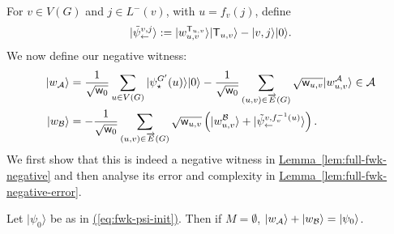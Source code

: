 \documentclass{theoretics}
\newcommand{\eq}[1]{\hyperref[eq:#1]{(\ref*{eq:#1})}}
\newcommand{\lem}[1]{\hyperref[lem:#1]{Lemma~\ref*{lem:#1}}}
\def\ket#1{{\lvert}#1\rangle}
\renewcommand{\>}{\rangle}
\newcommand{\<}{\langle}
\renewcommand{\(}{\left(}
\renewcommand{\)}{\right)}
\def\w{{\sf w}}
\begin{document}
For $v\in V(G)$ and $j\in L^-(v)$, with $u=f_v(j)$, define
\begin{equation}
\ket{\tilde\psi_{\leftarrow}^{v,j}}:=\ket{w_{u,v}^{{\sf T}_{u,v}}}\ket{{\sf T}_{u,v}}-\ket{v,j}\ket{0}.\label{eq:tilde-psi}
\end{equation}
We now define our negative witness:
\begin{align*}
\ket{w_{\cal A}} &= \frac{1}{\sqrt{\w_0}}\sum_{u\in V(G)}\ket{\psi_{\star}^{G'}(u)}\ket{0}-\frac{1}{\sqrt{\w_0}}\sum_{(u,v)\in\overrightarrow{E}(G)}\sqrt{\w_{u,v}}\ket{w_{u,v}^{\cal A}}    \in{\cal A}\\
\ket{w_{\cal B}} &= -\frac{1}{\sqrt{\w_0}}\sum_{(u,v)\in\overrightarrow{E}(G)}\sqrt{\w_{u,v}}\left(\ket{w_{u,v}^{\cal B}}+\ket{\tilde\psi_{\leftarrow}^{v,f_v^{-1}(u)}}\right).
\end{align*}
We first show that this is indeed a negative witness in \lem{full-fwk-negative} and then analyse its error and complexity in \lem{full-fwk-negative-error}.
\begin{lemma}\label{lem:full-fwk-negative}
Let $\ket{\psi_0}$ be as in \eq{fwk-psi-init}. Then if $M=\emptyset$, $\ket{w_{\cal A}}+\ket{w_{\cal B}}=\ket{\psi_0}$.
\end{lemma}
\end{document}
